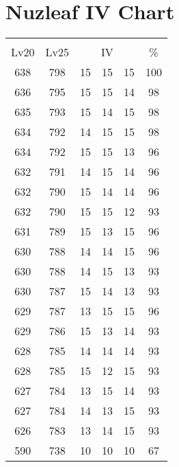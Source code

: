 \documentclass{article}%
\begin{document}
%
\normalsize%
\section{Nuzleaf IV Chart}%
\label{sec:Nuzleaf IV Chart}%
\renewcommand{\arraystretch}{1.5}%
\begin{tabular}{|c|c|c|c|c|c|}%
\hline%
\multicolumn{6}{|c|}{\textcolor{white}{ 
\linebreak{Nuzleaf}
}%
\cellcolor{black}}\\%
\multicolumn{1}{|c}{Lv20}&\multicolumn{1}{c|}{Lv25}&\multicolumn{3}{c|}{IV}&\multicolumn{1}{|c|}{\%}\\%
\hline%
\rowcolor{color100}%
638&798&15&15&15&100\\%
\hline%
\rowcolor{color98}%
636&795&15&15&14&98\\%
\hline%
\rowcolor{color98}%
635&793&15&14&15&98\\%
\hline%
\rowcolor{color98}%
634&792&14&15&15&98\\%
\hline%
\rowcolor{color96}%
634&792&15&15&13&96\\%
\hline%
\rowcolor{color96}%
632&791&14&15&14&96\\%
\hline%
\rowcolor{color96}%
632&790&15&14&14&96\\%
\hline%
\rowcolor{color93}%
632&790&15&15&12&93\\%
\hline%
\rowcolor{color96}%
631&789&15&13&15&96\\%
\hline%
\rowcolor{color96}%
630&788&14&14&15&96\\%
\hline%
\rowcolor{color93}%
630&788&14&15&13&93\\%
\hline%
\rowcolor{color93}%
630&787&15&14&13&93\\%
\hline%
\rowcolor{color96}%
629&787&13&15&15&96\\%
\hline%
\rowcolor{color93}%
629&786&15&13&14&93\\%
\hline%
\rowcolor{color93}%
628&785&14&14&14&93\\%
\hline%
\rowcolor{color93}%
628&785&15&12&15&93\\%
\hline%
\rowcolor{color93}%
627&784&13&15&14&93\\%
\hline%
\rowcolor{color93}%
627&784&14&13&15&93\\%
\hline%
\rowcolor{color93}%
626&783&13&14&15&93\\%
\hline%
\rowcolor{color91}%
590&738&10&10&10&67\\%
\end{tabular}

%
\end{document}
